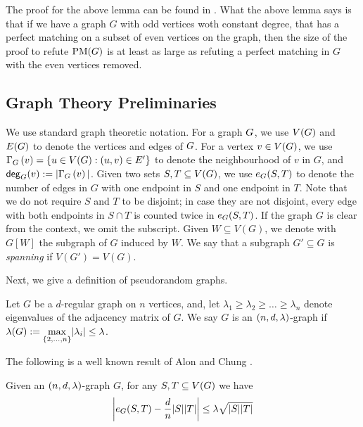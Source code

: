\documentclass[11pt]{article}
\begin{document}
The proof for the above lemma can be found in \citep[Lemma 2.2]{Austrin_2022}.
What the above lemma says is that if we have a graph $G$ with odd vertices woth constant degree, that has a perfect matching on a subset of even vertices on the graph, then the size of the proof to refute $\PM{G}$ is at least as large as refuting a perfect matching in $G$ with the even vertices removed.


\subsection{Graph Theory Preliminaries}
\label{sec:graph-theory-prelims}

We use standard graph theoretic notation. For a graph $\Graph$, we use $\Vertices{\Graph}$ and $\Edges{\Graph}$ to denote the vertices and edges of $\Graph$. For a vertex $v \in \Vertices{\Graph}$, we use $\Neighbourhood{G}{v} = \{ u \in \Vertices{\Graph} : (u,v) \in E' \}$ to denote the neighbourhood of $v$ in $G$, and $\degree{G}{v} := |\Neighbourhood{G}{v}|$. Given two sets $S, T \subseteq \Vertices{G}$, we  use $\CutEdges{S}{T}{G}$ to denote the number of edges in $G$ with one endpoint in $S$ and one endpoint in $T$.  Note that we do not require $S$ and $T$ to be disjoint; in case they are not disjoint, every edge with both endpoints in $S \cap T$ is counted twice in $\CutEdges{S}{T}{G}$. If the graph $G$ is clear from the context, we omit the subscript. Given $W \subseteq V(G)$, we denote with $G[W]$ the subgraph of $G$ induced by $W$. We say that a subgraph $G' \subseteq G$ is \emph{spanning} if $V(G') = V(G)$.

Next, we give a definition of pseudorandom graphs.

\begin{definition}\label{def:expander-graphs}
Let $G$ be a $d$-regular graph on $n$ vertices, and, let $\lambda_1 \geq \lambda_2 \ge \dots \geq \lambda_n$ denote eigenvalues of the adjacency matrix of $G$.
We say $G$ is an $\EnDeeLambda$-graph if $\ExpansionFactor{\Graph} := \underset{{\{2, \dots, n\}}}{\max}|\lambda_i| \leq \lambda$.
\end{definition}

The following is a well known result of Alon and Chung \cite{alon88mixing}.

\begin{lemma}\label{lemma:expanders-mixing-lemma}
  Given an $\EnDeeLambda$-graph $G$, for any $S, T \subseteq \Vertices{G}$ we have
$$
  \left| \CutEdges{S}{T}{G} - \frac{d}{n}|S||T| \right|
  \le \lambda\sqrt{\Size{S}\Size{T} }
$$
\end{lemma}
\end{document}

